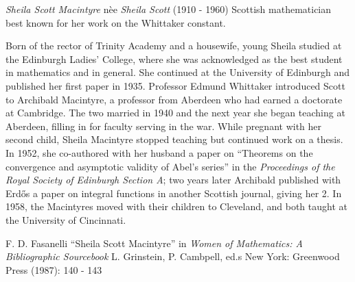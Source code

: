 \documentclass[12pt]{article}
\begin{document}

\emph{Sheila Scott Macintyre} n\`ee \emph{Sheila Scott} (1910 - 1960) Scottish mathematician best known for her work on the Whittaker constant.

Born of the rector of Trinity Academy and a housewife, young Sheila studied at the Edinburgh Ladies' College, where she was acknowledged as the best student in mathematics and in general. She continued at the University of Edinburgh and published her first paper in 1935. Professor Edmund Whittaker introduced Scott to Archibald Macintyre, a professor from Aberdeen who had earned a doctorate at Cambridge. The two married in 1940 and the next year she began teaching at Aberdeen, filling in for faculty serving in the war. While pregnant with her second child, Sheila Macintyre stopped teaching but continued work on a thesis. In 1952, she co-authored with her husband a paper on ``Theorems on the convergence and asymptotic validity of Abel's series'' in the {\it Proceedings of the Royal Society of Edinburgh Section A}; two years later Archibald published with Erd\H{o}s a paper on integral functions in another Scottish journal, giving her  2. In 1958, the Macintyres moved with their children to Cleveland, and both taught at the University of Cincinnati.

\begin{thebibliography}{1}
 F. D. Fasanelli ``Sheila Scott Macintyre'' in {\it Women of Mathematics: A Bibliographic Sourcebook} L. Grinstein, P. Cambpell, ed.s New York: Greenwood Press (1987): 140 - 143
\end{thebibliography}
\end{document}
